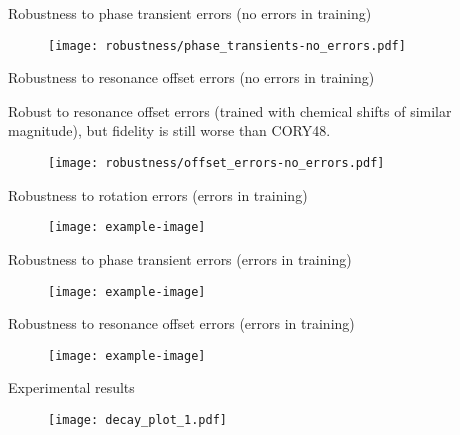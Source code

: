 \documentclass{beamer}
\begin{document}
\begin{frame}{Robustness to phase transient errors  (no errors in training)}

\begin{figure}
    \centering
    \texttt{[image: robustness/phase\_transients-no\_errors.pdf]}
\end{figure}

\end{frame}

\begin{frame}{Robustness to resonance offset errors  (no errors in training)}

Robust to resonance offset errors (trained with chemical shifts of similar magnitude), but fidelity is still worse than CORY48.

\begin{figure}
    \centering
    \texttt{[image: robustness/offset\_errors-no\_errors.pdf]}
\end{figure}

\end{frame}


\begin{frame}{Robustness to rotation errors (errors in training)}

\begin{figure}
    \centering
    \texttt{[image: example-image]}
\end{figure}

\end{frame}

\begin{frame}{Robustness to phase transient errors (errors in training)}

\begin{figure}
    \centering
    \texttt{[image: example-image]}
\end{figure}

\end{frame}

\begin{frame}{Robustness to resonance offset errors (errors in training)}

\begin{figure}
    \centering
    \texttt{[image: example-image]}
\end{figure}

\end{frame}

\begin{frame}{Experimental results}

\begin{figure}
\centering
\texttt{[image: decay\_plot\_1.pdf]}
\end{figure}

\end{frame}
\end{document}
